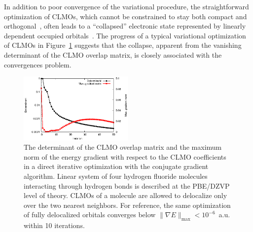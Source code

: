 \documentclass[aps,prl,twocolumn,reprint,amsmath,amssymb]{revtex4-1}
\begin{document}
%
In addition to poor convergence of the variational procedure, the straightforward optimization of CLMOs, which cannot be constrained to stay both compact and orthogonal~\cite{stoll1980use, RZZK}, often leads to a ``collapsed'' electronic state represented by linearly dependent occupied orbitals~\cite{ordejon1995linear}. 
%
The progress of a typical variational optimization of CLMOs in Figure~\ref{fig:det} suggests that the collapse, apparent from the vanishing determinant of the CLMO overlap matrix, is closely associated with the convergences problem.


\begin{figure}
\includegraphics[width=0.5\textwidth]{det}
\caption{
The determinant of the CLMO overlap matrix and the maximum norm of the energy gradient with respect to the CLMO coefficients in a direct iterative optimization with the conjugate gradient algorithm. Linear system of four hydrogen fluoride molecules interacting through hydrogen bonds is described at the PBE/DZVP level of theory. CLMOs of a molecule are allowed to delocalize only over the two nearest neighbors. For reference, the same optimization of fully delocalized orbitals converges below $\| \nabla E \|_{\text{max}} < 10^{-6}$~a.u. within 10 iterations.}
\label{fig:det}
\end{figure}
\end{document}
